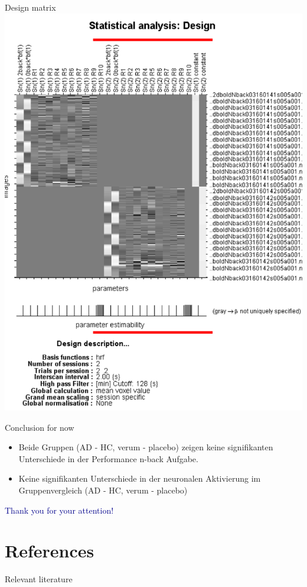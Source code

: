 \documentclass{bredelebeamer}
\begin{document}
\begin{frame}{Design matrix}
\centering
\includegraphics[scale=0.40]{images/DesiMatr.PNG}
\end{frame}

\begin{frame}{Conclusion for now}
\begin{block} {}
    \begin{itemize}
            \item Beide Gruppen (AD - HC, verum - placebo) zeigen keine signifikanten Unterschiede in der Performance n-back Aufgabe.
        \item Keine signifikanten Unterschiede in der neuronalen Aktivierung im Gruppenvergleich (AD - HC, verum - placebo)
            \end{itemize}
        \end{block}
        \end{frame}
\begin{frame}
    \centering
    \Huge{\textcolor{darkblue}{Thank you for your attention!}}
\end{frame}        

\section{References}
\begin{frame}{Relevant literature}
\tiny 


\end{frame}
\end{document}
